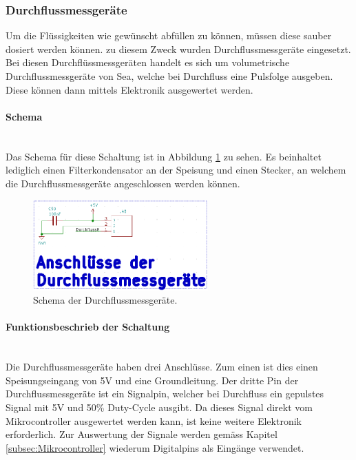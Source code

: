 \subsubsection{Durchflussmessgeräte}
\label{subsubsec:Durchflussmessgeräte}

Um die Flüssigkeiten wie gewünscht abfüllen zu können, müssen diese sauber dosiert werden können. zu diesem Zweck wurden Durchflussmessgeräte eingesetzt. Bei diesen Durchflüssmessgeräten handelt es sich um volumetrische Durchflussmessgeräte von Sea, welche bei Durchfluss eine Pulsfolge ausgeben. Diese können dann mittels Elektronik ausgewertet werden.

\paragraph{Schema}\mbox{}\\

Das Schema für diese Schaltung ist in Abbildung \ref{fig:Schema_Durchflussmessgeräte} zu sehen. Es beinhaltet lediglich einen Filterkondensator an der Speisung und einen Stecker, an welchem die Durchflussmessgeräte angeschlossen werden können.

\begin{figure}[h!]
	\centering
	\includegraphics[width=0.6\textwidth]{graphics/Schema_Durchflussmessgeraete.png}
	\caption{Schema der Durchflussmessgeräte.}
	\label{fig:Schema_Durchflussmessgeräte}
\end{figure}

\paragraph{Funktionsbeschrieb der Schaltung}\mbox{}\\

Die Durchflussmessgeräte haben drei Anschlüsse. Zum einen ist dies einen Speisungseingang von 5V und eine Groundleitung. Der dritte Pin der Durchflussmessgeräte ist ein Signalpin, welcher bei Durchfluss ein gepulstes Signal mit 5V und 50\% Duty-Cycle ausgibt. Da dieses Signal direkt vom Mikrocontroller ausgewertet werden kann, ist keine weitere Elektronik erforderlich. Zur Auswertung der Signale werden gemäss Kapitel \ref{subsec:Mikrocontroller} wiederum Digitalpins als Eingänge verwendet.   